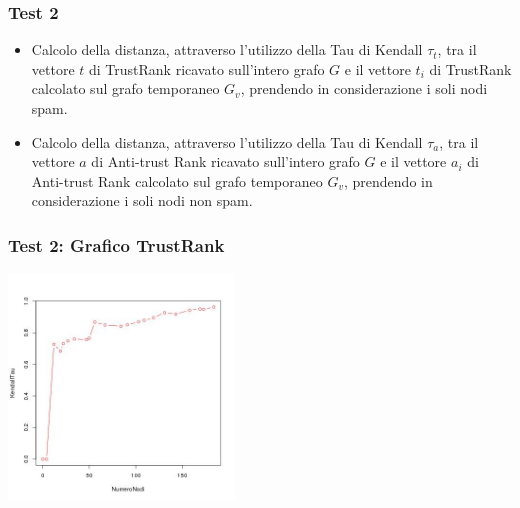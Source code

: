 \documentclass{beamer}
\begin{document}
\begin{frame}
\frametitle{Test 2}
  \begin{itemize}
   \item<1-> Calcolo della distanza, attraverso l’utilizzo della Tau di Kendall \(\tau_t\), tra il vettore \(t\) di TrustRank ricavato sull’intero grafo \(G\) e il vettore \(t_i\) di TrustRank calcolato sul grafo temporaneo \(G_v\), prendendo in considerazione i soli nodi spam.
   \item<2-> Calcolo della distanza, attraverso l’utilizzo della Tau di Kendall \(\tau_a\), tra il vettore \(a\) di Anti-trust Rank ricavato sull’intero grafo \(G\) e il vettore \(a_i\) di Anti-trust Rank calcolato sul grafo temporaneo \(G_v\), prendendo in considerazione i soli nodi non spam.
  \end{itemize}
  \end{frame}
  \begin{frame}
\frametitle{Test 2: Grafico TrustRank}
\begin{center}
 \includegraphics[height=6cm]{immagini/test2/trustrankBadNodesTestMode1_62}
\end{center}
\end{frame}
\end{document}
